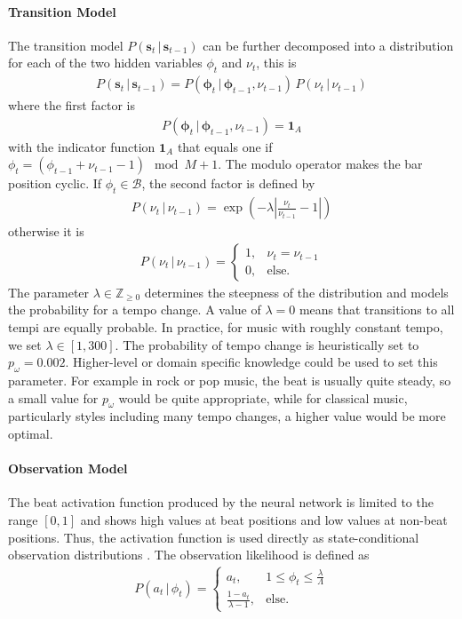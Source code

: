 \documentclass{scrartcl}
\begin{document}
\paragraph{Transition Model} The transition model $P(\mathbf s_t\,|\,\mathbf s_{t-1})$ can be further decomposed into a distribution for each of the two hidden variables $\phi_t$ and $\nu_t$, this is
\begin{align}
P(\mathbf s_t\,|\,\mathbf s_{t-1}) = P(\mathbf \phi_t\,|\,\mathbf \phi_{t-1}, \nu_{t-1}) \, P(\nu_t \, |\, \nu_{t-1}) 
\end{align} 
where the first factor is
\begin{align}
P(\mathbf \phi_t\,|\,\mathbf \phi_{t-1}, \nu_{t-1}) = \mathbf 1_A
\end{align} 
with the indicator function $\mathbf 1_A$ that equals one if $\phi_t = (\phi_{t-1}+\nu_{t-1}-1)\mod M+1$. The modulo operator makes the bar position cyclic. If $\phi_t \in \mathcal B$, the second factor is defined by
\begin{align}
P(\nu_t \, |\, \nu_{t-1}) = \exp \left( -\lambda \left| \frac{\nu_{t}}{\nu_{t-1}} -1 \right| \right)
\end{align} 
otherwise it is
\begin{align}
P(\nu_t \, |\, \nu_{t-1}) = \begin{cases}
    1, &\nu_t = \nu_{t-1}\\
    0, &\text{else.} 
\end{cases}
\end{align} 
The parameter $\lambda \in \mathbb Z_{\geq0}$ determines the steepness of the distribution and models the probability for a tempo change. A value of $\lambda = 0$ means that transitions to all tempi are equally probable. In practice, for music with roughly constant tempo, we set $\lambda \in [1, 300]$. The probability of tempo change is heuristically set to $p_\omega = 0.002$. Higher-level or domain specific knowledge could be used to set this parameter. For example in rock or pop music, the beat is usually quite steady, so a small value for $p_\omega$ would be quite appropriate, while for classical music, particularly styles including many tempo changes, a higher value would be more optimal.


\paragraph{Observation Model}
The beat activation function produced by the neural network is limited to the range $[0, 1]$ and shows high values at beat positions and low values at non-beat positions. Thus, the activation function is used directly as state-conditional observation distributions \cite{Degara2012}. The observation likelihood is defined as 
\begin{align}
P(a_t\,|\,\phi_t) = \begin{cases}
    a_t, &1 \leq \phi_t\leq \frac{\lambda}{\Lambda}\\
    \frac{1-a_t}{\lambda-1}, &\text{else}.    
\end{cases}
\end{align} 
\end{document}
